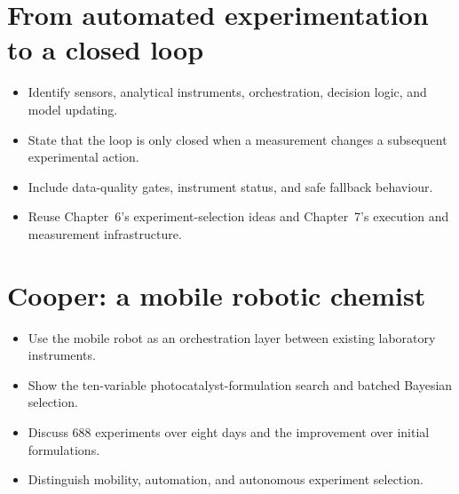 \section{From automated experimentation to a closed loop}

\begin{itemize}
  \item Identify sensors, analytical instruments, orchestration, decision logic, and model updating.
  \item State that the loop is only closed when a measurement changes a subsequent experimental action.
  \item Include data-quality gates, instrument status, and safe fallback behaviour.
  \item Reuse Chapter~6's experiment-selection ideas and Chapter~7's execution and measurement infrastructure.
\end{itemize}


\section{Cooper: a mobile robotic chemist}

\begin{itemize}
  \item Use the mobile robot as an orchestration layer between existing laboratory instruments.
  \item Show the ten-variable photocatalyst-formulation search and batched Bayesian selection.
  \item Discuss 688 experiments over eight days and the improvement over initial formulations.
  \item Distinguish mobility, automation, and autonomous experiment selection.
\end{itemize}

